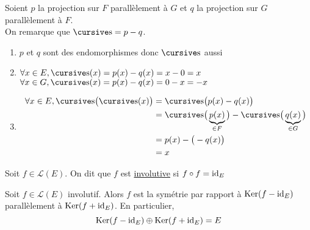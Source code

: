 \begin{prv}
	Soient $p$ la projection sur $F$ parallèlement à $G$ et $q$ la projection sur $G$ parallèlement à $F$.\\
	On remarque que $\s = p - q$.
	\begin{enumerate}
		\item $p$ et $q$ sont des endomorphismes donc $\s$ aussi
		\item $\forall x \in E, \s(x) = p(x) - q(x) = x - 0 = x$ \\
			$\forall x \in G, \s(x) = p(x) - q(x) = 0 - x = -x$ 
		\item
			\begin{align*}
				\forall x \in E, \s\big(\s(x)\big) &= \s\big(p(x) - q(x)\big) \\
				&= \s\big(\underbrace{p(x)}_{\in F}\big) - \s\big(\underbrace{q(x)}_{\in G}\big) \\
				&= p(x) - \big(-q(x)\big) \\
				&= x \\
			\end{align*}
	\end{enumerate}
\end{prv}

\begin{defn}
	Soit $f \in \mathcal{L}(E)$. On dit que $f$ est \underline{involutive} si $f \circ f = \operatorname{id}_{E}$
\end{defn}

\begin{prop}
	Soit $f \in \mathcal{L}(E)$ involutif. Alors $f$ est la symétrie par rapport à $\operatorname{Ker}(f - \operatorname{id}_E)$ parallèlement à $\operatorname{Ker}(f + \operatorname{id}_E)$. En particulier, \[
		\operatorname{Ker}(f - \operatorname{id}_E) \oplus \operatorname{Ker}(f + \operatorname{id}_E) = E
	\]
\end{prop}

